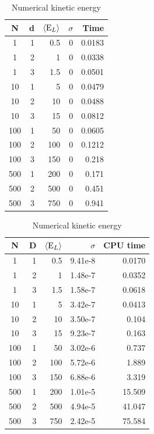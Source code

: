 \documentclass[english, a4paper]{article}
\begin{document}
\begin{table}[H]
      \begin{minipage}{.5\linewidth}
  \centering
  \begin{tabular}{ | c | r | r | r | r |}
    \hline
    N& d& $\langle {\textrm E_L}\rangle$& $\sigma$& Time \\*
    \hline
    1& 1& 0.5& 0& 0.0183 \\*
    \hline
    1& 2& 1& 0&  0.0338\\*
    \hline
    1& 3& 1.5& 0&  0.0501\\*
    \hline
    10& 1& 5& 0&  0.0479\\*
    \hline
    10& 2& 10& 0&  0.0488\\*
    \hline
    10& 3& 15& 0&  0.0812\\*
    \hline
    100& 1& 50& 0&  0.0605\\*
    \hline
    100& 2& 100& 0&  0.1212\\*
    \hline
    100& 3& 150& 0&  0.218\\*
    \hline
    500& 1& 200& 0&  0.171\\*
    \hline
    500& 2& 500& 0&  0.451\\*
    \hline
    500& 3& 750& 0&  0.941\\*
    \hline
  \end{tabular}
  \caption{Analytical kinetic energy}
  \label{tab:Tabell3}
  \end{minipage}
  \begin{minipage}{.5\linewidth}
   \centering
     \begin{tabular}{ | c | r | r | r | r |}
    \hline
    N& D& $\langle {\textrm E_L}\rangle$& $\sigma$& CPU time \\*
    \hline
    1& 1& 0.5& 9.41e-8& 0.0170 \\*
    \hline
    1& 2& 1& 1.48e-7&  0.0352\\*
    \hline
    1& 3& 1.5& 1.58e-7&  0.0618\\*
    \hline
    10& 1& 5& 3.42e-7&  0.0413\\*
    \hline
    10& 2& 10& 3.50e-7&  0.104\\*
    \hline
    10& 3& 15& 9.23e-7&  0.163\\*
    \hline
    100& 1& 50& 3.02e-6&  0.737\\*
    \hline
    100& 2& 100& 5.72e-6&  1.889\\*
    \hline
    100& 3& 150& 6.88e-6&  3.319\\*
    \hline
    500& 1& 200& 1.01e-5&  15.509\\*
    \hline
    500& 2& 500& 4.94e-5&  41.047\\*
    \hline
    500& 3& 750& 2.42e-5&  75.584\\*
    \hline
  \end{tabular}
  \caption{Numerical kinetic energy}
  \label{tab:Tabell4}
  \end{minipage}
\end{table}
\end{document}
